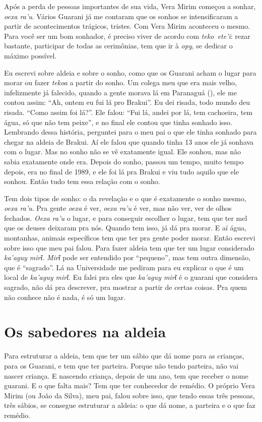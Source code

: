 Após a perda de pessoas importantes de sua vida, Vera Mirim começou a
sonhar, \emph{oexa ra’u}. Vários Guarani já me contaram que os sonhos se
intensificaram a partir de acontecimentos trágicos, tristes. Com Vera
Mirim aconteceu o mesmo. Para você ser um bom sonhador, é preciso viver
de acordo com \emph{teko~ete’i}: rezar bastante, participar de todas as
cerimônias, tem que ir à \emph{opy}, se dedicar o máximo possível.

Eu escrevi sobre aldeia e sobre o sonho, como que os Guarani acham o
lugar para morar ou fazer \emph{tekoa} a partir do sonho. Um colega meu que
era mais velho, infelizmente já falecido, quando a gente morava lá em
Paranaguá (), ele me contou assim: ``Ah, ontem eu fui lá pro Brakui''.
Eu dei risada, todo mundo deu risada. ``Como assim foi lá?''. Ele falou:
``Fui lá, andei por lá, tem cachoeira, tem água, só que não tem peixe'',
e no final ele contou que tinha sonhado isso. Lembrando dessa história,
perguntei para o meu pai o que ele tinha sonhado para chegar na aldeia
de Brakui. Aí ele falou que quando tinha 13 anos ele já sonhava com o
lugar. Mas no sonho não se vê exatamente igual. Ele sonhou, mas não
sabia exatamente onde era. Depois do sonho, passou um tempo, muito
tempo depois, era no final de 1989, e ele foi lá pra Brakui e viu tudo
aquilo que ele sonhou. Então tudo tem essa relação com o sonho.

Tem dois tipos de sonho: o da revelação e o que é exatamente o sonho
mesmo, \emph{oexa ra’u}. Pra gente \emph{oexa} é ver, \emph{oexa ra’u} é ver, mas não ver,
ver de olhos fechados. \emph{Oexa ra’u} o lugar, e para conseguir escolher o
lugar, tem que ter mel que os deuses deixaram pra nós. Quando tem isso,
já dá pra morar. E aí água, montanhas, animais específicos tem que ter
pra gente poder morar. Então escrevi sobre isso que meu pai falou. Para
fazer aldeia tem que ter um lugar considerado \emph{ka’aguy mirῖ}. \emph{Mirῖ} pode ser
entendido por ``pequeno'', mas tem outra dimensão, que é ``sagrado''.
Lá na Universidade me pediram para eu explicar o que é um local de \emph{ka’aguy
mirῖ}. Eu falei pra eles que \emph{ka’aguy mirῖ} é o guarani que considera sagrado, não dá pra descrever, pra mostrar a partir de certas coisas.
Pra quem não conhece não é nada, é só um lugar.

\section{Os sabedores na aldeia}

Para estruturar a aldeia, tem que ter um sábio que dá nome para as
crianças, para os Guarani, e tem que ter parteira. Porque não tendo
parteira, não vai nascer criança. E nascendo criança, depois de um ano,
tem que receber o nome guarani. E o que falta mais? Tem que ter
conhecedor de remédio. O próprio Vera Mirim (ou João da Silva), meu
pai, falou sobre isso, que tendo essas três pessoas, três sábios, se
consegue estruturar a aldeia: o que dá nome, a parteira e o que faz
remédio.

